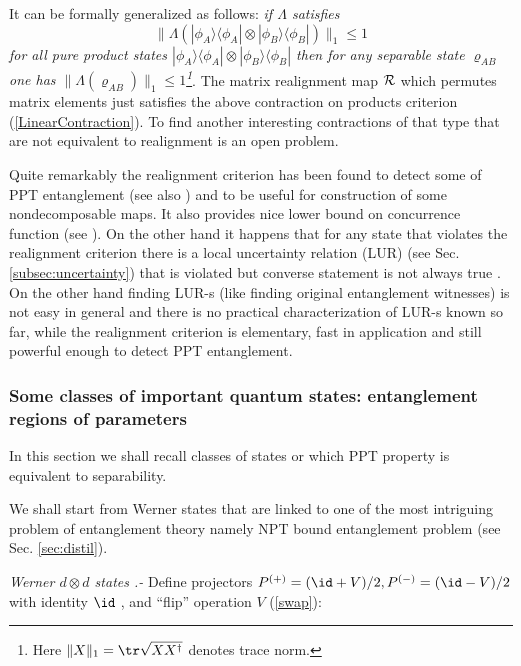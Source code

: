 \documentclass[twocolumn,aps,rmp]{revtex4}
\begin{document}
It can be formally generalized as follows: {\it if $\Lambda$ satisfies
\begin{equation} \|\Lambda(|\phi_{A}\rangle\langle
\phi_{A}| \otimes |\phi_{B}\rangle\langle \phi_{B}|) \|_1\leq 1
\label{LinearContraction}
\end{equation}
for all pure product states $|\phi_{A}\rangle\langle \phi_{A}| \otimes
|\phi_{B}\rangle\langle \phi_{B}|$ then for any separable state
$\varrho_{AB}$ one has $\|\Lambda(\varrho_{AB})\|_1\leq 1$\footnote{
Here $\|X\|_1=\tr \sqrt{X X^\dagger}$ denotes trace norm.}}. The
matrix realignment map ${\cal R}$ which permutes matrix elements just
satisfies the above contraction on products criterion
(\ref{LinearContraction}). To find another interesting contractions of
that type that are not equivalent to realignment is an open problem.

Quite remarkably the realignment criterion has been found to detect
some of PPT entanglement \cite{ChenWu}(see also
\cite{Rudolph2003-JPA}) and to be useful for construction of some
nondecomposable maps. It also provides nice lower bound on concurrence
function (see \cite{AlbeverioLowerBoundPRL}). On the other hand it
happens that for any state that violates the realignment criterion
there is a local uncertainty relation (LUR) (see
Sec. \ref{subsec:uncertainty}) that is violated but converse statement
is not always true \cite{LURstrongerthanCCN}. On the other hand
finding LUR-s (like finding original entanglement witnesses) is not
easy in general and there is no practical characterization of LUR-s
known so far, while the realignment criterion is elementary, fast in
application and still powerful enough to detect PPT entanglement.


\subsubsection{Some classes of important quantum states: entanglement
regions of parameters}
\label{subsec:Werner_Iso}

In this section we shall recall classes of states or which PPT
property is equivalent to separability.

We shall start from Werner states that are linked to one of the most
intriguing problem of entanglement theory namely NPT bound
entanglement problem
\cite{DiVincenzoSSTT1999-nptbound,DurCLB1999-npt-bound} (see
Sec. \ref{sec:distil}).

{\it  Werner $d \otimes d$ states \cite{Werner1989} .-} Define
projectors $P^{(+)}=(\id + V)/ 2,P^{(-)}=(\id - V)/ 2$ with identity
$\id$ , and ``flip'' operation $V$ (\ref{swap}):
\end{document}
